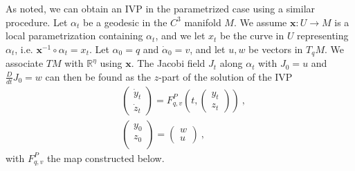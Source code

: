 \documentclass[final]{svjour3}
\newcommand{\RR}{\mathbb{R}}
\newcommand{\Df}[2]{\tfrac{D}{d#2} #1}
\newcommand{\param}[1]{\mathbf{#1}}
\begin{document}
As noted, we can obtain an IVP in the parametrized
case using a similar procedure. Let $\alpha_t$ be a geodesic in the $C^3$ manifold $M$. We assume 
$\param{x}:U\rightarrow M$ is a local parametrization containing $\alpha_t$, and
we let $x_t$ be the curve in $U$ representing $\alpha_t$, i.e. $\param{x}^{-1}\circ\alpha_t=x_t$. 
Let $\alpha_0=q$ and $\dot{\alpha}_0=v$, and let $u,w$ be vectors in $T_qM$. We
associate $TM$ with $\RR^\eta$ using $\param{x}$.
The Jacobi field $J_t$ along $\alpha_t$ with $J_0=u$ and
$\Df{J_0}{t}=w$ can then be found as the $z$-part of the solution of the IVP
    \begin{equation}
        \begin{split}
            &
            \begin{pmatrix}
                \dot{y}_t\\
                \dot{z}_t
            \end{pmatrix}
            =
            F_{q,v}^P\left(t,
            \begin{pmatrix}
                y_t\\
                z_t
            \end{pmatrix}
            \right)
            \ ,\\
            &
            \begin{pmatrix}
                y_0\\
                z_0\\
            \end{pmatrix}
            =
            \begin{pmatrix}
                w\\
                u
            \end{pmatrix}
            \ ,
        \end{split}
        \label{sys:JP}
    \end{equation}
    with $F_{q,v}^P$ the map constructed below.
\end{document}
